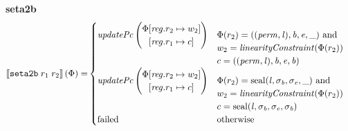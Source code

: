\documentclass[a3paper]{article}
\newcommand{\sem}[1]{\left\llbracket #1 \right\rrbracket}
\newcommand{\tand}{\text{ and }}
\newcommand{\totherwise}{\text{otherwise }}
\newcommand{\targetcolor}[1]{\color{black}}
\newcommand{\trg}[1]{{\targetcolor{} #1}}
\newcommand{\zinstr}[1]{\texttt{#1}}
\newcommand{\twoinstr}[3]{
  \ifthenelse{\equal{#2#3}{}}
  {\zinstr{#1}}
  {\zinstr{#1} \; #2 \; #3}
}
\newcommand{\tsetatob}[2]{\twoinstr{\trg{seta2b}}{#1}{#2}}
\newcommand{\update}[2]{[#1 \mapsto #2]}
\newcommand{\updReg}[2]{\update{\reg.#1}{#2}}
\newcommand{\shareddom}[1]{\mathrm{#1}}
\newcommand{\perm}{\var{perm}}
\newcommand{\lin}{\var{l}}
\newcommand{\seal}[1]{\shareddom{seal}(#1)}
\newcommand{\failed}{\mathrm{failed}}
\newcommand{\var}[1]{\mathit{#1}}
\newcommand{\reg}{\var{reg}}
\newcommand{\baddr}{\var{b}}
\newcommand{\eaddr}{\var{e}}
\newcommand{\plainfun}[2]{
  \ifthenelse{\equal{#2}{}}
  {\mathit{#1}}
  {\mathit{#1}(#2)}
}
\newcommand{\linCons}[1]{\plainfun{linearityConstraint}{#1}}
\newcommand{\updPcAddr}[1]{\plainfun{updatePc}{#1}}
\begin{document}
\noindent\textbf{seta2b}\\
\begin{align*}
  \sem{\tsetatob{r_1}{r_2}}(\Phi) = & 
                                \begin{cases}
                                  \updPcAddr{}\left(
                                    \arraycolsep=0pt
                                    \begin{array}{rl}
                                    \Phi&\updReg{r_2}{w_2}\\
                                        &\updReg{r_1}{c}
                                    \end{array} \right)
&
                                    \arraycolsep=0pt
                                    \begin{array}[t]{l}
                                      \Phi(r_2) = ((\perm,\lin),\baddr,\eaddr,\_) \tand \\
                                      w_2 = \linCons{\Phi(r_2)}\\
                                      c = ((\perm,\lin),\baddr,\eaddr,\baddr)
                                    \end{array} \\
                                  \updPcAddr{}\left(
                                    \arraycolsep=0pt
                                    \begin{array}{rl}
                                    \Phi&\updReg{r_2}{w_2}\\
                                        &\updReg{r_1}{c}
                                    \end{array} \right)
&
                                    \arraycolsep=0pt
                                    \begin{array}[t]{l}
                                      \Phi(r_2) = \seal{\lin,\sigma_\baddr,\sigma_\eaddr,\_} \tand \\
                                      w_2 = \linCons{\Phi(r_2)}\\
                                      c = \seal{\lin,\sigma_\baddr,\sigma_\eaddr,\sigma_\baddr}
                                    \end{array} \\
                                    \failed & \totherwise
                                \end{cases}
\end{align*}
\end{document}

